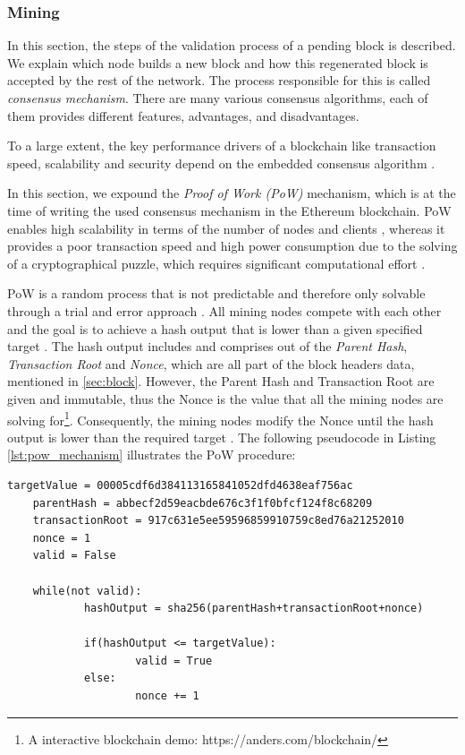 \subsubsection{Mining}
\label{sec:mining}
In this section, the steps of the validation process of a pending block is described. 
We explain which node builds a new block and how this regenerated block is accepted by the rest of the network.
The process responsible for this is called \textit{consensus mechanism}.
There are many various consensus algorithms, each of them provides different features,
advantages, and disadvantages. 

To a large extent, the key performance drivers of a blockchain
like transaction speed, scalability and security depend on the embedded consensus algorithm . 

In this section, we expound the \textit{Proof of Work (PoW)} mechanism, 
which is at the time of writing the used consensus mechanism in the Ethereum blockchain.
PoW enables high scalability in terms of the number 
of nodes and clients , whereas it provides a poor transaction speed and high 
power consumption due to the solving of a cryptographical puzzle, which requires 
significant computational effort . 

PoW is a random process that is not predictable and therefore only solvable through a 
trial and error approach . 
All mining nodes compete with each other and the goal is to achieve a hash output that 
is lower than a given specified target .
The hash output includes and comprises out of the \textit{Parent Hash}, \textit{Transaction Root} and
\textit{Nonce}, which are all part of the block headers data, mentioned in \ref{sec:block}.
However, the Parent Hash and Transaction Root are given and immutable, thus the Nonce
is the value that all the mining nodes are solving for\footnote{A interactive blockchain demo: https://anders.com/blockchain/}.
Consequently, the mining nodes modify the Nonce until the hash output is lower than the required target .
The following pseudocode in Listing \ref{lst:pow_mechanism} illustrates the PoW procedure:

\vspace{7mm}
\begin{lstlisting}[label={lst:pow_mechanism}, caption={Pseudocode of PoW Mechanism}]
	targetValue = 00005cdf6d384113165841052dfd4638eaf756ac
	parentHash = abbecf2d59eacbde676c3f1f0bfcf124f8c68209
	transactionRoot = 917c631e5ee59596859910759c8ed76a21252010
	nonce = 1
	valid = False

	while(not valid):
			hashOutput = sha256(parentHash+transactionRoot+nonce)
		
			if(hashOutput <= targetValue):
					valid = True
			else:
					nonce += 1

\end{lstlisting}
\clearpage

